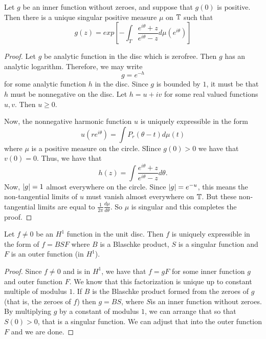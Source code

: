 \begin{theorem}
    Let $g$ be an inner function without zeroes, and suppose that $g(0)$ is positive. Then there is a unique singular positive measure $\mu$ on $\mathbb T$ such that
    \begin{equation*}
	g(z)= exp \left[ - \int_{T} \frac{e^{i\theta} + z}{e^{i\theta} - z} d\mu \left( e^{i\theta} \right) \right]
    \end{equation*}
    \label{thm:factoring-inner-function}
\end{theorem}
\begin{proof}
    Let $g$ be analytic function in the disc which is zerofree. Then $g$ has an analytic logarithm. Therefore, we may write 
    \begin{equation*}
	g= e^{-h}
    \end{equation*}
    for some analytic function $h$ in the disc. Since $g$ is bounded by $1$, it must be that $h$ must be nonnegative on the disc. Let $h=u+iv$ for some real valued functions $u,v$. Then $u\ge 0$.

    Now, the nonnegative harmonic function $u$ is uniquely expressible in the form
    \begin{equation*}
	u\left( re^{i\theta} \right) = \int P_{r} \left( \theta-t \right) d\mu \left( t \right)
    \end{equation*}
    where $\mu$ is a positive measure on the circle. SIince $g\left( 0 \right) > 0$ we  have that $v\left( 0 \right) = 0$. Thus, we have that 
    \begin{equation*}
	h\left( z \right) = \int \frac{e^{i\theta}+z}{e^{i\theta}-z} d\theta.
    \end{equation*}
    Now, $\left\lvert g \right\rvert=1$ almost everywhere on the circle. Since $\left\lvert g \right\rvert=e^{-u}$, this means the non-tangential limits of $u$ must vanish almost everywhere on $\mathbb T$. But these non-tangential limits are equal to $\frac{1}{2\pi} \frac{d\mu}{d\theta}$. So $\mu$ is singular and this completes the proof.
\end{proof}

\begin{theorem}
    Let $f \ne 0$ be an $H^{1}$ function in the unit disc. Then $f$ is uniquely expressible in the form of $f=BSF$ where $B$ is a Blaschke product, $S$ is a singular function and $F$ is an outer function (in $H^{1}$).
    \label{thm:BSF}
\end{theorem}
\begin{proof}
    Since $f \ne 0$ and is in $H^{1}$, we have that $f=gF$ for some inner function $g$ and outer function $F$. We know that this factorization is unique up to constant multiple of modulus $1$. If $B$ is the Blaschke product formed from the zeroes of $g$ (that is, the zeroes of $f$) then $g=BS$, where $S$is an inner function without zeroes. By multiplying $g$ by a constant of modulus $1$, we can arrange that so that $S\left( 0 \right) > 0$, that is a singular function. We can adjust that into the outer function $F$ and we are done.
\end{proof}

